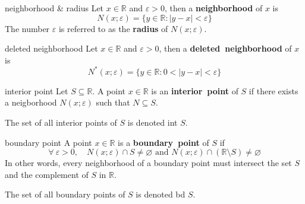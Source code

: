 \documentclass[avery5371,grid]{flashcards}
\newcommand{\R}{\mathbb{R}}
\begin{document}

\begin{flashcard}[Definition]{neighborhood \& radius}
Let $x \in \R$ and $\varepsilon > 0$, then a \mbox{\textbf{neighborhood}}
of $x$ is
\begin{equation*}
N(x;\varepsilon) = \{ y \in \R : |y-x|<\varepsilon \}
\end{equation*}
The number $\varepsilon$ is referred to as the \mbox{\textbf{radius}}
of $N(x;\varepsilon)$.
\end{flashcard}

\begin{flashcard}[Definition]{deleted neighborhood}
Let $x \in \R$ and $\varepsilon > 0$, then a
\mbox{\textbf{deleted neighborhood}} of $x$ is
\begin{equation*}
N^{*}(x;\varepsilon) = \{ y \in \R : 0<|y-x|<\varepsilon \}
\end{equation*}
\end{flashcard}

\begin{flashcard}[Definition]{interior point}
Let $S \subseteq \R$.  A point $x \in \R$ is an
\mbox{\textbf{interior point}} of $S$ if there exists a neigborhood
$N(x;\varepsilon)$ such that $N \subseteq S$.

\bigskip
The set of all interior points of $S$ is denoted int $S$.
\end{flashcard}

\begin{flashcard}[Definition]{boundary point}
A point $x \in \R$ is a \mbox{\textbf{boundary point}} of $S$ if
\begin{equation*}
\forall \ \varepsilon > 0, \quad N(x;\varepsilon) \cap S \neq \varnothing
\textrm{ and } N(x;\varepsilon) \cap (\R \setminus S) \neq \varnothing
\end{equation*}
In other words, every neighborhood of a boundary point must intersect the
set $S$ and the complement of $S$ in $\R$.

\medskip
The set of all boundary points of $S$ is denoted bd $S$.
\end{flashcard}
\end{document}
